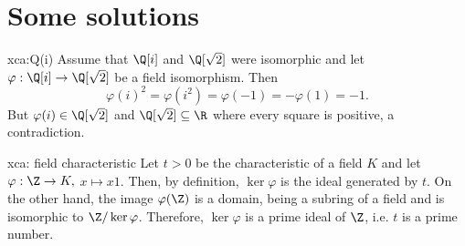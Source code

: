 \section*{Some solutions}

\fancyhf{}
\fancyfoot[R]{\thepage}
\fancyhead[L]{\course}
\setlength{\headheight}{14pt}

\newtheorem{lemma*}{Lemma}




\begin{sol}{xca:Q(i)}
Assume that $\Q[i]$ and $\Q[\sqrt{2}]$ were isomorphic 
and let $\varphi:\Q[i]\to \Q[\sqrt{2}]$
be a field isomorphism.
Then 
    \[
    \varphi(i)^2=
    \varphi(i^2)=
    \varphi(-1)=
    -\varphi(1)=-1.
    \]
But $\varphi(i)\in\Q[\sqrt{2}]$ and
$\Q[\sqrt{2}]\subseteq \R$ where every square is 
positive, a contradiction.
\end{sol}

\begin{sol}{xca: field characteristic}
    Let $t>0$ be the characteristic of a field $K$ and 
    let $\varphi:\Z\to K,$ $x\mapsto x1$.
    Then, by definition, $\ker\varphi$ is 
    the ideal generated by $t$.
    On the other hand, the image $\varphi(\Z)$ is 
    a domain, being a subring of a field
    and is isomorphic to $\Z/\ker\varphi$.
    Therefore, $\ker\varphi$ is a prime ideal of $\Z$,
    i.e. $t$ is a prime number.
\end{sol}

